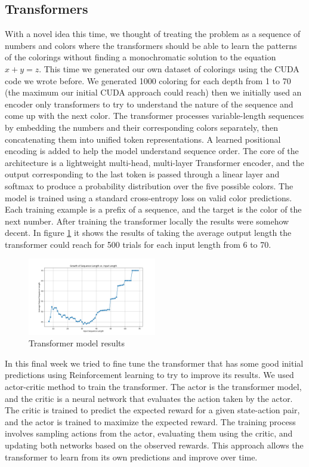 \documentclass[12pt]{article}
\begin{document}
\subsection{Transformers}
With a novel idea this time, we thought of treating the problem as a sequence of numbers and colors where the transformers should be able to learn the patterns of the colorings without finding a monochromatic solution to the equation $x + y = z$. This time we generated our own dataset of colorings using the CUDA code we wrote before.
We generated 1000 coloring for each depth from 1 to 70 (the maximum our initial CUDA approach could reach) then we initially used an encoder only transformers to try to understand the nature of the sequence and come up with the next color. The transformer processes variable-length sequences by embedding the numbers and their corresponding colors separately, then concatenating them into unified token representations. A learned positional encoding is added to help the model understand sequence order. The core of the architecture is a lightweight multi-head, multi-layer Transformer encoder, and the output corresponding to the last token is passed through a linear layer and softmax to produce a probability distribution over the five possible colors. The model is trained using a standard cross-entropy loss on valid color predictions.
Each training example is a prefix of a sequence, and the target is the color of the next
number. After training the transformer locally the results were somehow decent. In figure \ref{fig:transformer} it shows the results of taking the average output length the transformer could reach for 500 trials for each input length from 6 to 70.
\begin{figure}[h]
    \centering
    \includegraphics[width=0.5\textwidth]{images/TransformerOnly.png}
    \caption{Transformer model results}
    \label{fig:transformer}
\end{figure} 

In this final week we tried to fine tune the transformer that has some good initial predictions using Reinforcement learning to try to improve its results. We used actor-critic method to train the transformer. The actor is the transformer model, and the critic is a neural network
that evaluates the action taken by the actor. The critic is trained to predict the expected reward for a given state-action pair, and the actor is trained to maximize the expected reward. The training process involves sampling actions from the actor, evaluating them using the critic, 
and updating both networks based on the observed rewards. This approach allows the transformer to learn from its own predictions and improve over time.
\end{document}

